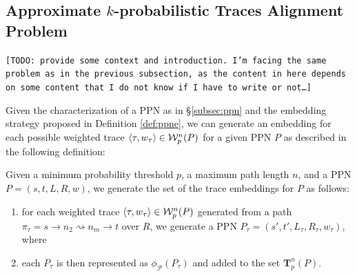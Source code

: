 \subsection{Approximate $k$-probabilistic Traces Alignment Problem}\label{subsec:akptap}
\texttt{\color{red}[TODO: provide some context and introduction. I'm facing the same problem as in the previous subsection, as the content in here depends on some content that I do not know if I have to write or not\dots]}

Given the characterization of a PPN as in \S\ref{subsec:ppn} and the embedding strategy proposed in Definition \ref{def:ppne}, we can generate an embedding for each possible weighted trace $\braket{\tau,w_\tau}\in\mathcal{W}_p^n(P)$ for a given PPN $P$ as described in the following definition:
\begin{definition}
Given a minimum probability threshold $p$, a maximum path length $n$, and a PPN $P=(s,t,L,R,w)$, we generate the set of the trace embeddings for $P$ as follows:
\begin{enumerate}
	\item for each weighted trace $\braket{\tau,w_\tau}\in\mathcal{W}_p^n(P)$ generated from a path $\pi_\tau=s\to n_2\rightsquigarrow n_m\to t$ over $R$, we generate a PPN $P_\tau=(s',t',L_\tau,R_\tau,w_\tau)$, where 
	\item each $P_\tau$ is then represented as $\phi_{\mathcal{P}}(P_\tau)$ and added to the set $\mathbf{T}_p^n(P)$.
\end{enumerate}
\end{definition}

